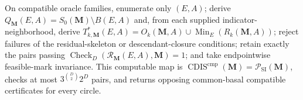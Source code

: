 On compatible oracle families, enumerate only \((E,A)\); derive \(Q_{\mathbf M}(E,A)=S_0(\mathbf M)\setminus B(E,A)\) and, from each supplied indicator-neighborhood, derive \(T^*_{k,\mathbf M}(E,A)=O_k(\mathbf M,A)\cup\operatorname{Min}_E(R_k(\mathbf M,A))\); reject failures of the residual-skeleton or descendant-closure conditions; retain exactly the pairs passing \(\operatorname{Check}_{D}(\mathcal R_{\mathbf M}(E,A),\mathbf M)=1\); and take endpointwise feasible-mark invariance.  This computable map is \(\operatorname{CDIS}^{\mathrm{cmp}}(\mathbf M)=\mathcal P_{\mathrm{SI}}(\mathbf M)\), checks at most \(3^{\binom D2}2^D\) pairs, and returns opposing common-basal compatible certificates for every circle.